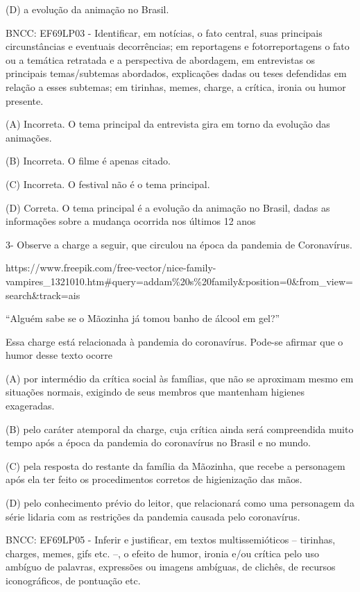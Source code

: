 \begin{itemize}
\begin{itemize}
{\begin{itemize}
\begin{itemize}
(D) a evolução da animação no Brasil.

BNCC: EF69LP03 - Identificar, em notícias, o fato central, suas
principais circunstâncias e eventuais decorrências; em reportagens e
fotorreportagens o fato ou a temática retratada e a perspectiva de
abordagem, em entrevistas os principais temas/subtemas abordados,
explicações dadas ou teses defendidas em relação a esses subtemas; em
tirinhas, memes, charge, a crítica, ironia ou humor presente.

(A) Incorreta. O tema principal da entrevista gira em torno da evolução
das animações.

(B) Incorreta. O filme é apenas citado.

(C) Incorreta. O festival não é o tema principal.

(D) Correta. O tema principal é a evolução da animação no Brasil, dadas
as informações sobre a mudança ocorrida nos últimos 12 anos

3- Observe a charge a seguir, que circulou na época da pandemia de
Coronavírus.

https://www.freepik.com/free-vector/nice-family-vampires\_1321010.htm\#query=addam\%20s\%20family\&position=0\&from\_view=search\&track=ais

``Alguém sabe se o Mãozinha já tomou banho de álcool em gel?''

Essa charge está relacionada à pandemia do coronavírus. Pode-se afirmar
que o humor desse texto ocorre

(A) por intermédio da crítica social às famílias, que não se aproximam
mesmo em situações normais, exigindo de seus membros que mantenham
higienes exageradas.

(B) pelo caráter atemporal da charge, cuja crítica ainda será
compreendida muito tempo após a época da pandemia do coronavírus no
Brasil e no mundo.

(C) pela resposta do restante da família da Mãozinha, que recebe a
personagem após ela ter feito os procedimentos corretos de higienização
das mãos.

(D) pelo conhecimento prévio do leitor, que relacionará como uma
personagem da série lidaria com as restrições da pandemia causada pelo
coronavírus.

BNCC: EF69LP05 - Inferir e justificar, em textos multissemióticos --
tirinhas, charges, memes, gifs etc. --, o efeito de humor, ironia e/ou
crítica pelo uso ambíguo de palavras, expressões ou imagens ambíguas, de
clichês, de recursos iconográficos, de pontuação etc.


\end{itemize}
\end{itemize}}
\end{itemize}
\end{itemize}
